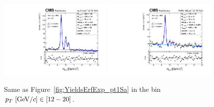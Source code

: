 \begin{figure}
  \includegraphics[width=0.49\textwidth]{Chapters/aYield/pp/pt_3p5_4/Pt/Pt_12_20/pp2p76tev_Pt_12_20_fsr1.pdf}  
  \includegraphics[width=0.49\textwidth]{Chapters/aYield/PbPb/pt_3p5_4/Pt/Pt_12_20/PbPb_Pt_12_20_fsr1.pdf}
  \caption{Same as Figure~\ref{fig:YieldsErfExp_pt1Sa} in the bin $p_{T}~[{\rm GeV}/c]\in [12 - 20]$.}
  \label{fig:YieldsErfExp_pt1Se} 
\end{figure}
\clearpage

